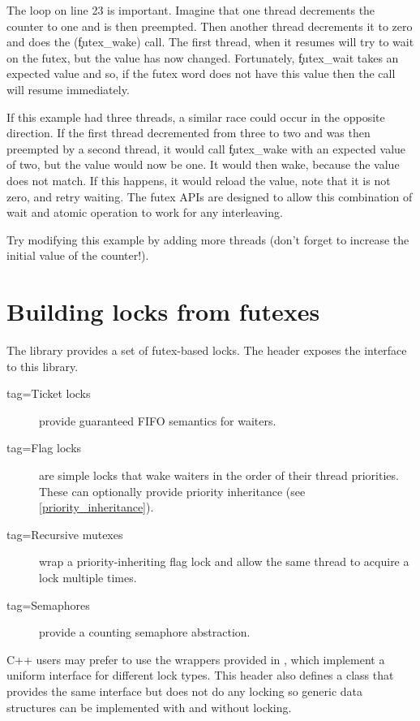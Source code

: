 The loop on line 23 is important.
Imagine that one thread decrements the counter to one and is then preempted.
Then another thread decrements it to zero and does the  (\c{futex_wake}) call.
The first thread, when it resumes will try to wait on the futex, but the value has now changed.
Fortunately, \c{futex_wait} takes an expected value and so, if the futex word does not have this value then the call will resume immediately.

If this example had three threads, a similar race could occur in the opposite direction.
If the first thread decremented from three to two and was then preempted by a second thread, it would call \c{futex_wake} with an expected value of two, but the value would now be one.
It would then wake, because the value does not match.
If this happens, it would reload the value, note that it is not zero, and retry waiting.
The futex APIs are designed to allow this combination of wait and atomic operation to work for any interleaving.

Try modifying this example by adding more threads (don't forget to increase the initial value of the counter!).

\section{Building locks from futexes}

The  library provides a set of futex-based locks.
The  header exposes the interface to this library.

\begin{description}
	\item[tag=Ticket locks]{ provide guaranteed FIFO semantics for waiters.}
	\item[tag=Flag locks]{  are simple locks that wake waiters in the order of their thread priorities.
	      These can optionally provide priority inheritance (see \ref{priority_inheritance}).}
	\item[tag=Recursive mutexes]{ wrap a priority-inheriting flag lock and allow the same thread to acquire a lock multiple times.}
	\item[tag=Semaphores]{ provide a counting semaphore abstraction.}
\end{description}

C++ users may prefer to use the wrappers provided in , which implement a uniform interface for different lock types.
This header also defines a  class that provides the same interface but does not do any locking so generic data structures can be implemented with and without locking.

